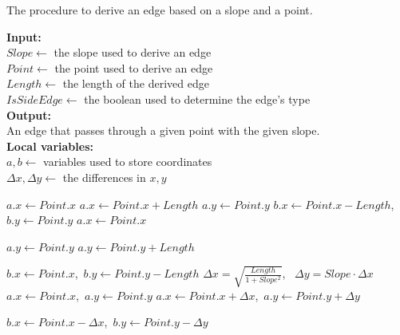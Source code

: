 \begin{algorithm}[tb!]
    \caption{The procedure to derive an edge based on a slope and a point.}\label{alg:derive corridor point}
    \textbf{Input:} \\
    $ Slope \gets $ the slope used to derive an edge \\
    $ Point \gets $ the point used to derive an edge \\
    $ Length \gets $ the length of the derived edge \\
    $ IsSideEdge \gets $ the boolean used to determine the edge's type \\

    \textbf{Output:} \\
    An edge that passes through a given point with the given slope. \\

    \textbf{Local variables:} \\
    $ a,b \gets $ variables used to store coordinates \\
    $ \Delta x, \Delta y \gets $ the differences in $ x, y $ \\

    \begin{algorithmic}[1]

                    \State $ a.x \gets Point.x $
                \Else
                    \State $ a.x \gets Point.x + Length $
                \EndIf
                \State $ a.y \gets Point.y $
                \State $ b.x \gets Point.x - Length $,~$ b.y \gets Point.y $
            \EndCase
                \State $ a.x \gets Point.x $

                    \State $ a.y \gets Point.y $
                \Else
                    \State $ a.y \gets Point.y + Length $
                \EndIf

                \State $ b.x \gets Point.x $,~$ b.y \gets Point.y - Length $
            \EndCase
            \Default
                \State $ \Delta x = \sqrt{\frac{Length}{{1+Slope^2}}}$,~ $ \Delta y = Slope \cdot \Delta x $
                    \State $ a.x \gets Point.x $,~$ a.y \gets Point.y $
                \Else
                    \State $ a.x \gets Point.x + \Delta x $,~$ a.y \gets Point.y + \Delta y $
                \EndIf
                
                \State $ b.x \gets Point.x - \Delta x $,~$ b.y \gets Point.y - \Delta y $
            \EndDefault

        \EndSwitch

        \State {}

        \EndProcedure

    \end{algorithmic}
\end{algorithm}

